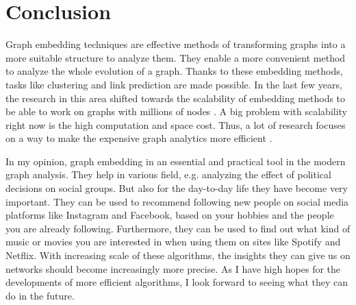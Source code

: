 \documentclass[sigconf]{acmart}
\begin{document}
\section{Conclusion}
Graph embedding techniques are effective methods of transforming graphs into a more suitable structure to analyze them. They enable a more convenient method to analyze the whole evolution of a graph.
Thanks to these embedding methods, tasks like clustering and link prediction are made possible.
In the last few years, the research in this area shifted towards the scalability of embedding methods to be able to work on graphs with millions of nodes \cite{Bruss.03.07.2019}.
A big problem with scalability right now is the high computation and space cost. Thus, a lot of research focuses on a way to make the expensive graph analytics more efficient \cite{Cai.22.09.2017}.


In my opinion, graph embedding in an essential and practical tool in the modern graph analysis. They help in various field, e.g. analyzing the effect of political decisions on social groups. %
But also for the day-to-day life they have become very important. They can be used to recommend following new people on social media platforms like Instagram and Facebook, based on your hobbies and the people you are already following.
Furthermore, they can be used to find out what kind of music or movies you are interested in when using them on sites like Spotify and Netflix. 
With increasing scale of these algorithms, the insights they can give us on networks should become increasingly more precise. As I have high hopes for the developments of more efficient algorithms, I look forward to seeing what they can do in the future.




\end{document}
